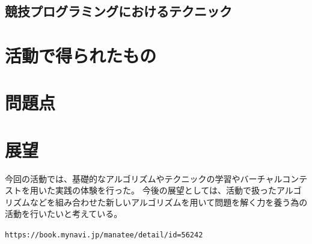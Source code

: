 \documentclass[11pt,a4paper]{jsarticle}
\begin{document}
\subsection{競技プログラミングにおけるテクニック}
\section{活動で得られたもの}
\section{問題点}
\section{展望}
今回の活動では、基礎的なアルゴリズムやテクニックの学習やバーチャルコンテストを用いた実践の体験を行った。
今後の展望としては、活動で扱ったアルゴリズムなどを組み合わせた新しいアルゴリズムを用いて問題を解く力を養う為の活動を行いたいと考えている。
\begin{thebibliography}
    \texttt{https://book.mynavi.jp/manatee/detail/id=56242}
\end{thebibliography}




%
%
\end{document}
